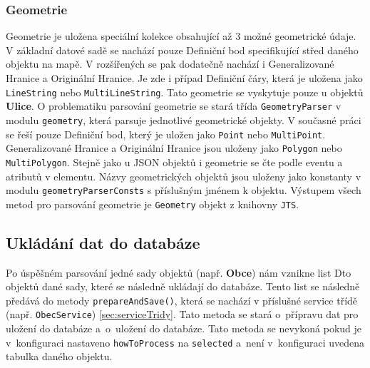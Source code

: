 \subsubsection*{Geometrie}
Geometrie je uložena speciální kolekce obsahující až 3 možné geometrické údaje.
V základní datové sadě se nachází pouze Definiční bod specifikující střed daného objektu na mapě.
V rozšířených se pak dodatečně nachází i Generalizované Hranice a Originální Hranice.
Je zde i případ Definiční čáry, která je uložena jako \texttt{LineString} nebo \texttt{MultiLineString}.
Tato geometrie se vyskytuje pouze u objektů \textbf{Ulice}.
O problematiku parsování geometrie se stará třída \texttt{GeometryParser} v modulu \texttt{geometry}, která parsuje jednotlivé geometrické objekty.
V současné práci se řeší pouze Definiční bod, který je uložen jako \texttt{Point} nebo \texttt{MultiPoint}.
Generalizované Hranice a Originální Hranice jsou uloženy jako \texttt{Polygon} nebo \texttt{MultiPolygon}.
Stejně jako u JSON objektů i geometrie se čte podle eventu a atributů v elementu.
Názvy geometrických objektů jsou uloženy jako konstanty v modulu \texttt{geometryParserConsts} s příslušným jménem k objektu.
Výstupem všech metod pro parsování geometrie je \texttt{Geometry} objekt z knihovny \texttt{JTS}.

\subsection{Ukládání dat do databáze}
Po úspěšném parsování jedné sady objektů (např. \textbf{Obce}) nám vznikne list Dto objektů
dané sady, které se následně ukládají do databáze. Tento list se následně předává do metody \texttt{prepareAndSave()},
která se nachází v příslušné service třídě (např. \texttt{ObecService}) \ref{sec:serviceTridy}.
Tato metoda se stará o~přípravu dat pro uložení do databáze a~o~uložení do databáze.
Tato metoda se nevykoná pokud je v~konfiguraci nastaveno \texttt{howToProcess} na \texttt{selected}
a~není v~konfiguraci uvedena tabulka daného objektu.

